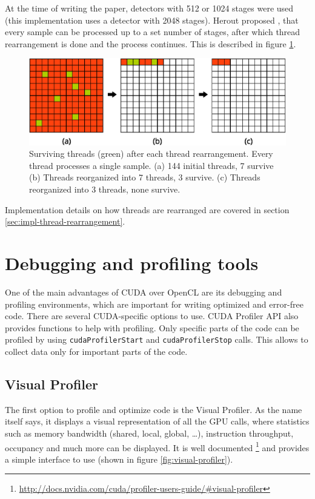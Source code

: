 At the time of writing the paper, detectors with 512 or 1024 stages were used (this implementation uses a detector with 2048 stages). Herout proposed \cite{herout2011real}, that every sample can be processed up to a set number of stages, after which thread rearrangement is done and the process continues. This is described in figure \ref{fig:thread-rearrangement}.

\begin{center}
\begin{figure}[ht]
	\centering\includegraphics[width=0.75\linewidth]{fig/thread-rearrangement.eps}
	\caption{Surviving threads (green) after each thread rearrangement. Every thread processes a single sample. (a) 144 initial threads, 7 survive (b) Threads reorganized into 7 threads, 3 survive. (c) Threads reorganized into 3 threads, none survive.}
	\label{fig:thread-rearrangement}
\end{figure}
\end{center}

Implementation details on how threads are rearranged are covered in section \ref{sec:impl-thread-rearrangement}.

\section{Debugging and profiling tools}\label{sec:debugging-and-profiling}

One of the main advantages of CUDA over OpenCL are its debugging and profiling environments, which are important for writing optimized and error-free code. There are several CUDA-specific options to use. CUDA Profiler API also provides functions to help with profiling. Only specific parts of the code can be profiled by using \verb|cudaProfilerStart| and \verb|cudaProfilerStop| calls. This allows to collect data only for important parts of the code.

\subsection{Visual Profiler}\label{subsec:proftools-visual-profiler}

The first option to profile and optimize code is the Visual Profiler. As the name itself says, it displays a visual representation of all the GPU calls, where statistics such as memory bandwidth (shared, local, global, \dots), instruction throughput, occupancy and much more can be displayed. It is well documented \footnote{\url{http://docs.nvidia.com/cuda/profiler-users-guide/\#visual-profiler}} and provides a simple interface to use (shown in figure \ref{fig:visual-profiler}). 

